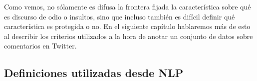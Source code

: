 Como vemos, no sólamente es difusa la frontera fijada la característica sobre qué es discurso de odio o insultos, sino que incluso también es difícil definir qué característica es protegida o no. En el siguiente capítulo hablaremos más de esto al describir los criterios utilizados a la hora de anotar un conjunto de datos sobre comentarios en Twitter.

\subsection{Definiciones utilizadas desde NLP}


